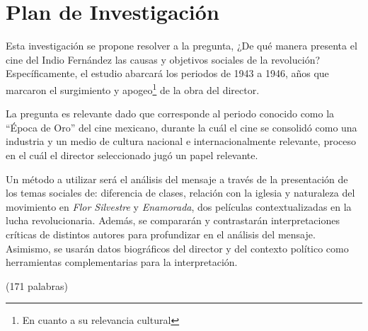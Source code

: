 \section{Plan de Investigación}
Esta investigación se propone resolver a la pregunta,
¿De qué manera presenta el cine del Indio Fernández las causas y objetivos sociales de la revolución? Específicamente, el estudio abarcará los periodos de 1943 a 1946, años que marcaron el surgimiento y apogeo\footnote{En cuanto a su relevancia cultural} de la obra del director\autocite[133]{mora_mexican_1978-2}.

La pregunta es relevante dado que corresponde al periodo conocido como la ``Época de Oro'' del cine mexicano, durante la cuál el cine se consolidó como una industria y un medio de cultura nacional e internacionalmente relevante, proceso en el cuál el director seleccionado jugó un papel relevante\autocite[133]{mora_mexican_1978-2}.

Un método a utilizar será el análisis del mensaje a través de la presentación de los temas sociales de: diferencia de clases, relación con la iglesia y naturaleza del movimiento en \emph{Flor Silvestre} y  \emph{Enamorada}, dos películas contextualizadas en la lucha revolucionaria. Además, se compararán y contrastarán interpretaciones críticas de distintos autores para profundizar en el análisis del mensaje.  Asimismo, se usarán datos biográficos del director y del contexto político como herramientas complementarias para la interpretación. 

(171 palabras)
\pagebreak
